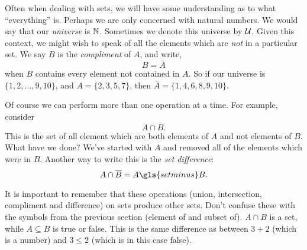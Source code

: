 \documentclass[12pt]{article}
\begin{document}
Often when dealing with sets, we will have some understanding as to what ``everything'' is.  Perhaps we are only concerned with natural numbers.  We would say that our \emph{universe} is $\mathbb N$.  Sometimes we denote this universe by $\mathcal U$.  Given this context, we might wish to speak of all the elements which are \emph{not} in a particular set.  We say $B$ is the \emph{compliment} of $A$, and write,
\[ B = \bar A\]
when $B$ contains every element not contained in $A$.  So if our universe is $\{1, 2,\ldots, 9, 10\}$, and $A = \{2, 3, 5, 7\}$, then $\bar A = \{1, 4, 6, 8, 9,10\}$.

Of course we can perform more than one operation at a time.  For example, consider
\[A \cap \bar B.\]
This is the set of all element which are both elements of $A$ and not elements of $B$.  What have we done?  We've started with $A$ and removed all of the elements which were in $B$.  Another way to write this is the \emph{set difference}:
\[A \cap \bar B = A \gls{setminus} B.\]

It is important to remember that these operations (union, intersection, compliment and difference) on sets produce other sets.  Don't confuse these with the symbols from the previous section (element of and subset of).  $A \cap B$ is a set, while $A \subseteq B$ is true or false.  This is the same difference as between $3 + 2$ (which is a number) and $3 \le 2$ (which is in this case false).
\end{document}
